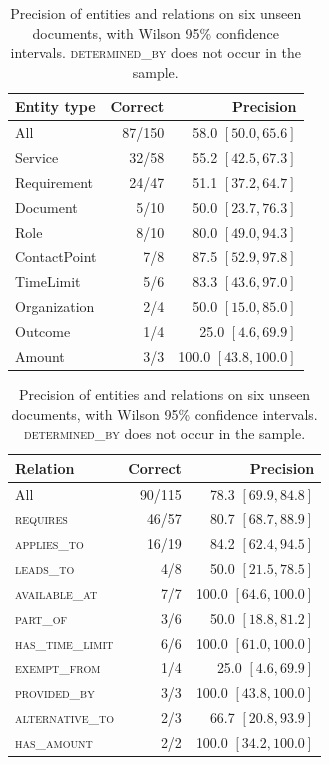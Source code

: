 \begin{table}[ht]
    \centering
    \caption{Precision of entities and relations on six unseen documents, with Wilson 95\%
             confidence intervals. \textsc{determined\_by} does not occur in the sample.}
    \label{tab:kg:precision}
    \small\setlength{\tabcolsep}{4pt}
    \begin{minipage}[t]{0.46\textwidth}\centering
    \begin{tabular}{lrr}
        \toprule
        Entity type & Correct & Precision \\
        \midrule
        All          & 87/150 & 58.0 $[50.0, 65.6]$ \\
        Service      & 32/58  & 55.2 $[42.5, 67.3]$ \\
        Requirement  & 24/47  & 51.1 $[37.2, 64.7]$ \\
        Document     & 5/10   & 50.0 $[23.7, 76.3]$ \\
        Role         & 8/10   & 80.0 $[49.0, 94.3]$ \\
        ContactPoint & 7/8    & 87.5 $[52.9, 97.8]$ \\
        TimeLimit    & 5/6    & 83.3 $[43.6, 97.0]$ \\
        Organization & 2/4    & 50.0 $[15.0, 85.0]$ \\
        Outcome      & 1/4    & 25.0 $[4.6, 69.9]$ \\
        Amount       & 3/3    & 100.0 $[43.8, 100.0]$ \\
        \bottomrule
    \end{tabular}
    \end{minipage}\hfill
    \begin{minipage}[t]{0.52\textwidth}\centering
    \begin{tabular}{lrr}
        \toprule
        Relation & Correct & Precision \\
        \midrule
        All                      & 90/115 & 78.3 $[69.9, 84.8]$ \\
        \textsc{requires}        & 46/57  & 80.7 $[68.7, 88.9]$ \\
        \textsc{applies\_to}     & 16/19  & 84.2 $[62.4, 94.5]$ \\
        \textsc{leads\_to}       & 4/8    & 50.0 $[21.5, 78.5]$ \\
        \textsc{available\_at}   & 7/7    & 100.0 $[64.6, 100.0]$ \\
        \textsc{part\_of}        & 3/6    & 50.0 $[18.8, 81.2]$ \\
        \textsc{has\_time\_limit} & 6/6   & 100.0 $[61.0, 100.0]$ \\
        \textsc{exempt\_from}    & 1/4    & 25.0 $[4.6, 69.9]$ \\
        \textsc{provided\_by}    & 3/3    & 100.0 $[43.8, 100.0]$ \\
        \textsc{alternative\_to} & 2/3    & 66.7 $[20.8, 93.9]$ \\
        \textsc{has\_amount}     & 2/2    & 100.0 $[34.2, 100.0]$ \\
        \bottomrule
    \end{tabular}
    \end{minipage}
\end{table}

